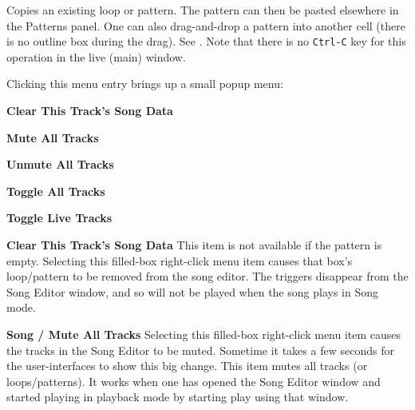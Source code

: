 %

   Copies an existing loop or pattern.
   The pattern can then be pasted elsewhere in the Patterns panel.
   One can also drag-and-drop a pattern into another cell (there is no outline
   box during the drag).
   See .
   Note that there is no \texttt{Ctrl-C} key for this operation in the
   live (main) window.

   Clicking this menu entry brings up a small popup menu:


   \begin{enumber}
      \item \textbf{Clear This Track's Song Data}
      \item \textbf{Mute All Tracks}
      \item \textbf{Unmute All Tracks}
      \item \textbf{Toggle All Tracks}
      \item \textbf{Toggle Live Tracks}
   \end{enumber}


   \textbf{Clear This Track's Song Data}
   This item is not available if the pattern is empty.
   Selecting this filled-box right-click menu item causes that box's
   loop/pattern to be removed from the song editor.
   The triggers disappear from the Song Editor window, and so will not
   be played when the song plays in Song mode.

   \textbf{Song / Mute All Tracks}
   Selecting this filled-box right-click menu item causes
   the tracks in the Song Editor to be muted.  Sometime it takes a few seconds
   for the user-interfaces to show this big change.
   This item mutes all tracks (or loops/patterns).
   It works when one has opened the Song Editor window
   and started playing in playback
   mode by starting play using that window.

